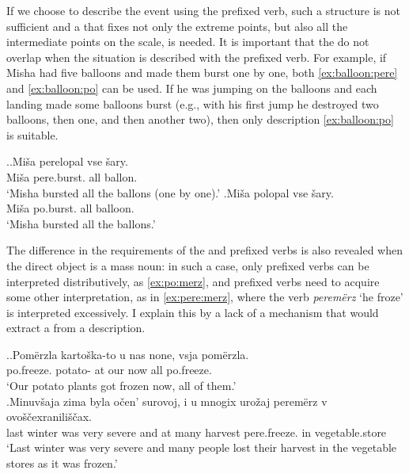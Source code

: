 If we choose to describe the event using the prefixed verb, such a structure is not sufficient and a  that fixes not only the extreme points, but also all the intermediate points on the scale, is needed. It is important that the  do not overlap when the situation is described with the prefixed verb. For example, if Misha had five balloons and made them burst one by one, both \ref{ex:balloon:pere} and \ref{ex:balloon:po} can be used. If he was jumping on the balloons and each landing made some balloons burst (e.g., with his first jump he destroyed two balloons, then one, and then another two), then only description \ref{ex:balloon:po} is suitable.

\ex.\ag.\label{ex:balloon:pere}Mi\v{s}a perelopal vse \v{s}ary.\\
Mi\v{s}a pere.burst. all ballon.\\
\trans `Misha bursted all the ballons (one by one).'
\bg.\label{ex:balloon:po}Mi\v{s}a polopal vse \v{s}ary.\\
Mi\v{s}a po.burst. all balloon.\\
\trans `Misha bursted all the ballons.'

The difference in the requirements of the  and prefixed verbs is also revealed when the direct object is a mass noun: in such a case, only prefixed verbs can be interpreted distributively, as \ref{ex:po:merz}, and prefixed verbs need to acquire some other interpretation, as in \ref{ex:pere:merz}, where the verb \textit{perem\"{e}rz} `he froze' is interpreted excessively. I explain this by a lack of a mechanism that would extract a  from a  description.

\ex.\ag.\label{ex:po:merz}Pom\"{e}rzla karto\v{s}ka-to u nas none, vsja pom\"{e}rzla.\\
po.freeze. potato- at our now all po.freeze.\\
\trans `Our potato plants got frozen now, all of them.'\\
\bg.\label{ex:pere:merz}Minuv\v{s}aja zima byla o\v{c}en' surovoj, i u mnogix uro\v{z}aj perem\"{e}rz v ovo\v{s}\v{c}exranili\v{s}\v{c}ax.\\
last winter was very severe and at many harvest pere.freeze. in vegetable.store\\
\trans `Last winter was very severe and many people lost their harvest in the vegetable stores as it was frozen.'

